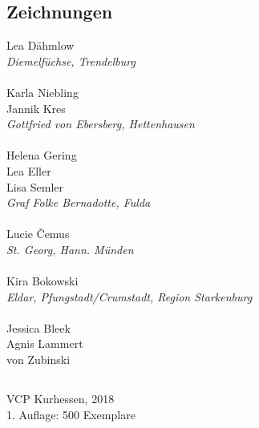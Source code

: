 \begin{centering}
\begin{multicols}{2}
\subsection*{Zeichnungen}
Lea Dähmlow \\ \textit{Diemelfüchse, Trendelburg} \\ ~\\
Karla Niebling \\ Jannik Kres \\ \textit{Gottfried von Ebersberg, Hettenhausen} \\ ~\\
Helena Gering \\ Lea Eller \\ Lisa Semler \\ \textit{Graf Folke Bernadotte, Fulda} \\ ~\\
Lucie \v{C}emus \\ \textit{St. Georg, Hann. Münden} \\ ~\\
Kira Bokowski \\ \textit{Eldar, Pfungstadt/Crumstadt, Region Starkenburg} \\ ~\\
Jessica Bleek \\ Agnis Lammert \\ von Zubinski

\end{multicols}

\vfill

\subsection*{}
VCP Kurhessen, 2018 \\
1. Auflage: 500 Exemplare

\end{centering}

